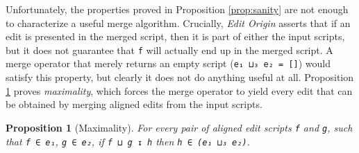 \documentclass{sigplanconf}
\theoremstyle{plain}
\newtheorem{prop}{Proposition}
\begin{document}

 

Unfortunately, the properties proved in Proposition \ref{prop:sanity}
are not enough to characterize a useful merge algorithm.
%
Crucially, \emph{Edit Origin} asserts that if an edit is presented in
the merged script, then it is part of either the input scripts, but it
does not guarantee that \texttt{f} will actually end up in the merged
script.
%
A merge operator that merely returns an empty script (\texttt{e₁ ⊔₃ e₂
  = []}) would satisfy this property, but clearly it does not do
anything useful at all.
%
Proposition \ref{prop:maximality} proves \emph{maximality}, which
forces the merge operator to yield every edit that can be obtained
by merging aligned edits from the input scripts.

\begin{prop}[Maximality]
  \label{prop:maximality}
  For every pair of aligned edit scripts \texttt{f} and \texttt{g},
  such that \texttt{f ∈ e₁}, \texttt{g ∈ e₂}, if \texttt{f ⊔ g ↧ h}
  then \texttt{h ∈ (e₁ ⊔₃ e₂)}.
\end{prop}
\end{document}

